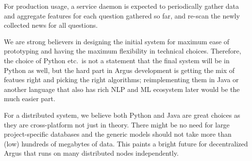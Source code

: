 \documentclass[11pt,a4paper]{article}
\begin{document}
For production usage,
a service daemon is expected to periodically gather data and aggregate
features for each question gathered so far, and re-scan the newly collected
news for all questions.

We are strong believers in designing the initial system for maximum
ease of prototyping and having the maximum flexibility in technical
choices.  Therefore, the choice of Python etc.\ is not a statement
that the final system will be in Python as well, but the hard part
in Argus development is getting the mix of featues right and picking
the right algorithms; reimplementing them in Java or another language
that also has rich NLP and ML ecosystem later would be the much easier
part.

For a distributed system, we believe both Python and Java are great
choices as they are cross-platform not just in theory.  There might
be no need for large project-specific databases and the generic models
should not take more than (low) hundreds of megabytes of data.  This
paints a bright future for decentralized Argus that runs on many
distributed nodes independently.



\end{document}
